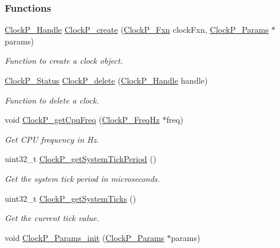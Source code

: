 \subsubsection*{Functions}
\begin{DoxyCompactItemize}
\item 
\hyperlink{_clock_p_8h_a003dd74e948999fe5c3f45d8f51501f1}{Clock\+P\+\_\+\+Handle} \hyperlink{_clock_p_8h_a1eab19790e2a9a2ed41fb4d900a3e12e}{Clock\+P\+\_\+create} (\hyperlink{_clock_p_8h_af516e3c763bec8fb9769ecc4ac7296bb}{Clock\+P\+\_\+\+Fxn} clock\+Fxn, \hyperlink{struct_clock_p___params}{Clock\+P\+\_\+\+Params} $\ast$params)
\begin{DoxyCompactList}\small\item\em Function to create a clock object. \end{DoxyCompactList}\item 
\hyperlink{_clock_p_8h_aa2030f172fe0c2dbc9ac0b082933c767}{Clock\+P\+\_\+\+Status} \hyperlink{_clock_p_8h_a307b64cb44053df12ca12ade68b3a788}{Clock\+P\+\_\+delete} (\hyperlink{_clock_p_8h_a003dd74e948999fe5c3f45d8f51501f1}{Clock\+P\+\_\+\+Handle} handle)
\begin{DoxyCompactList}\small\item\em Function to delete a clock. \end{DoxyCompactList}\item 
void \hyperlink{_clock_p_8h_ac0ac5819c6679eea45298919b789a48b}{Clock\+P\+\_\+get\+Cpu\+Freq} (\hyperlink{struct_clock_p___freq_hz}{Clock\+P\+\_\+\+Freq\+Hz} $\ast$freq)
\begin{DoxyCompactList}\small\item\em Get C\+P\+U frequency in Hz. \end{DoxyCompactList}\item 
uint32\+\_\+t \hyperlink{_clock_p_8h_a39de2743b275cf8fe1ddfeec815dd7fd}{Clock\+P\+\_\+get\+System\+Tick\+Period} ()
\begin{DoxyCompactList}\small\item\em Get the system tick period in microseconds. \end{DoxyCompactList}\item 
uint32\+\_\+t \hyperlink{_clock_p_8h_a46c12b1479924ea7e8bf3512a643a905}{Clock\+P\+\_\+get\+System\+Ticks} ()
\begin{DoxyCompactList}\small\item\em Get the current tick value. \end{DoxyCompactList}\item 
void \hyperlink{_clock_p_8h_a666e9ded465c969456e6c4ef95e849f4}{Clock\+P\+\_\+\+Params\+\_\+init} (\hyperlink{struct_clock_p___params}{Clock\+P\+\_\+\+Params} $\ast$params)

\end{DoxyCompactItemize}
